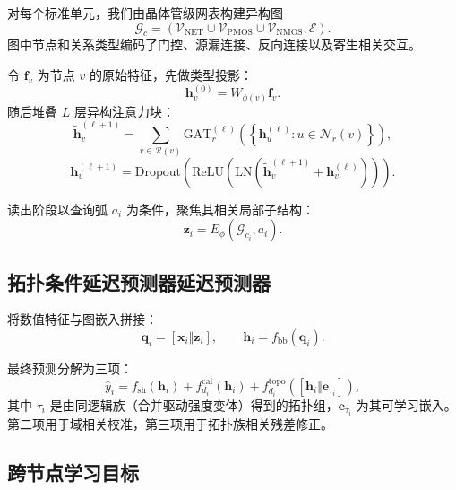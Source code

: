 ﻿\documentclass[10pt,a4paper]{ctexart}
\begin{document}
对每个标准单元，我们由晶体管级网表构建异构图
\begin{equation}
\mathcal{G}_{c}=\left(\mathcal{V}_{\mathrm{NET}}\cup\mathcal{V}_{\mathrm{PMOS}}\cup\mathcal{V}_{\mathrm{NMOS}},\mathcal{E}\right).
\end{equation}
图中节点和关系类型编码了门控、源漏连接、反向连接以及寄生相关交互。

令 $\mathbf{f}_v$ 为节点 $v$ 的原始特征，先做类型投影：
\begin{equation}
\mathbf{h}_v^{(0)} = W_{\phi(v)}\mathbf{f}_v.
\end{equation}
随后堆叠 $L$ 层异构注意力块：
\begin{equation}
\tilde{\mathbf{h}}_v^{(\ell+1)}=
\sum_{r\in\mathcal{R}(v)}
\mathrm{GAT}_r^{(\ell)}
\left(\left\{\mathbf{h}_u^{(\ell)}:u\in\mathcal{N}_r(v)\right\}\right),
\end{equation}
\begin{equation}
\mathbf{h}_v^{(\ell+1)}=
\mathrm{Dropout}\!\left(
\mathrm{ReLU}\!\left(
\mathrm{LN}\!\left(\tilde{\mathbf{h}}_v^{(\ell+1)}+\mathbf{h}_v^{(\ell)}\right)
\right)\right).
\end{equation}

读出阶段以查询弧 $a_i$ 为条件，聚焦其相关局部子结构：
\begin{equation}
\mathbf{z}_i = E_{\phi}\!\left(\mathcal{G}_{c_i},a_i\right).
\end{equation}

\subsection{拓扑条件延迟预测器延迟预测器}

将数值特征与图嵌入拼接：
\begin{equation}
\mathbf{q}_i = [\mathbf{x}_i \Vert \mathbf{z}_i], \qquad
\mathbf{h}_i = f_{\mathrm{bb}}(\mathbf{q}_i).
\end{equation}

最终预测分解为三项：
\begin{equation}
\hat y_i =
f_{\mathrm{sh}}(\mathbf{h}_i)
+ f^{\mathrm{cal}}_{d_i}(\mathbf{h}_i)
+ f^{\mathrm{topo}}_{d_i}\!\left([\mathbf{h}_i \Vert \mathbf{e}_{\tau_i}]\right),
\end{equation}
其中 $\tau_i$ 是由同逻辑族（合并驱动强度变体）得到的拓扑组，$\mathbf{e}_{\tau_i}$ 为其可学习嵌入。
第二项用于域相关校准，第三项用于拓扑族相关残差修正。

\subsection{跨节点学习目标}
\end{document}
